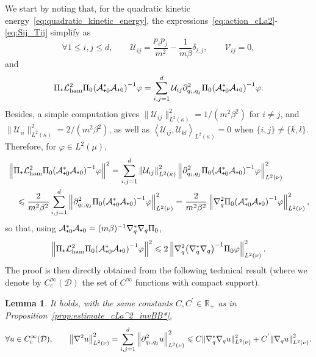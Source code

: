 \documentclass{article}
\newtheorem{lemma}{Lemma}
\newcommand{\cLa}{\mathcal{A}}
\newcommand{\cLham}{\mathcal{L}_{\rm ham}}
\newcommand{\cD}{\mathcal{D}}
\newcommand{\subplus}{\textnormal{\texttt{+}}}
\renewcommand{\leq}{\leqslant}
\begin{document}
We start by noting that, for the quadratic kinetic energy~\eqref{eq:quadratic_kinetic_energy}, the expressions~\eqref{eq:action_cLa2}-\eqref{eq:Sij_Tij} simplify as
 \[
\forall 1 \leq i,j \leq d, \qquad \mathcal{U}_{ij}= \frac{p_{i}p_{j}}{m^2} - \frac{1}{m\beta}\delta_{i,j}, \qquad 
\mathcal{V}_{ij}= 0,
\]
and
\[
\Pi_\subplus \cLham^2 \Pi_0 \qty(\cLa_{\subplus 0}^*\cLa_{\subplus 0})^{-1} \varphi = \sum_{i,j=1}^d \mathcal{U}_{ij} \partial^2_{q_i,q_j} \Pi_0 \qty(\cLa_{\subplus 0}^*\cLa_{\subplus 0})^{-1}\varphi.
\]
Besides, a simple computation gives $\|\mathcal{U}_{ij}\|_{L^2(\kappa)}^2 = 1/(m^2\beta^2)$ for $i\neq j$, and $\|\mathcal{U}_{ii}\|_{L^2(\kappa)}^2 = 2/(m^2\beta^2)$, as well as $\left \langle \mathcal{U}_{ij},\mathcal{U}_{kl}\right\rangle_{L^2(\kappa)} = 0$ when $\{i,j\} \neq \{k,l\}$. Therefore, for $\varphi \in L^2(\mu)$, 
\[
  \begin{aligned}
  & \left\|\Pi_\subplus\cLham^2 \Pi_0 \qty(\cLa_{\subplus 0}^*\cLa_{\subplus 0})^{-1} \varphi \right\|^2 = \sum_{i,j=1}^d  \left\|\mathcal{U}_{ij}\right\|_{L^2(\kappa)}^2 \left\| \partial_{q_i,q_j}^2 \Pi_0 \qty(\cLa_{\subplus 0}^*\cLa_{\subplus 0})^{-1}\varphi \right\|^2_{L^2(\nu)} \\
  & \quad\leq \frac{2}{m^2 \beta^2} \sum_{i,j=1}^d \left\| \partial_{q_i,q_j}^2 \Pi_0 \qty(\cLa_{\subplus 0}^*\cLa_{\subplus 0})^{-1}\varphi \right\|^2_{L^2(\nu)} = \frac{2}{m^2 \beta^2} \left\| \nabla_q^2\Pi_0 \qty(\cLa_{\subplus 0}^*\cLa_{\subplus 0})^{-1}\varphi \right\|_{L^2(\nu)}^2, 
\end{aligned}
\]
so that, using $\cLa_{\subplus 0}^*\cLa_{\subplus 0} = (m\beta)^{-1} \nabla_q^*\nabla_q \Pi_0$, 
\[
  \left\|\Pi_\subplus\cLham^2 \Pi_0 \qty(\cLa_{\subplus 0}^*\cLa_{\subplus 0})^{-1} \varphi \right\|^2 \leq 2 \left\| \nabla_q^2 \qty( \nabla_q^*\nabla_q)^{-1}\Pi_0 \varphi \right\|_{L^2(\nu)}^2.
\]
The proof is then directly obtained from the following technical result (where we denote by $C_\mathrm{c}^\infty(\cD)$ the set of $C^\infty$ functions with compact support). 

\begin{lemma}
\label{controlH2}
It holds, with the same constants $C,C^{'} \in \mathbb{R}_+$ as in Proposition~\ref{prop:estimate_cLa^2_invBB*}, 
\[
\forall u\in C_\mathrm{c}^\infty(\cD), \qquad \left\| \nabla^2 u \right\|^2_{L^2(\nu)} = \sum_{i,j=1}^d \left\|\partial_{q_i,q_j}^2 u\right\|^2_{L^2(\nu)} \leq C\|\nabla_q^{*}\nabla_q u\|^2_{L^2(\nu)} + C^{'}\norm{\nabla_{q}u}^2_{L^2(\nu)}.
\]
\end{lemma}
\end{document}

